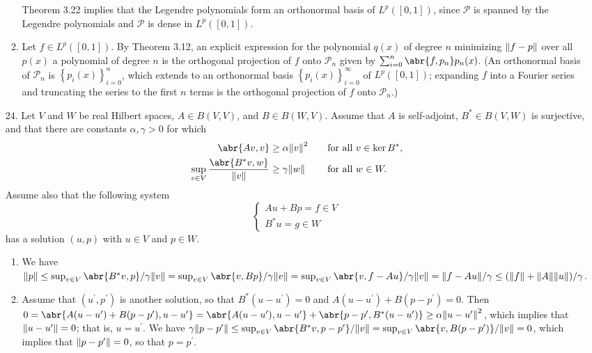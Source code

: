 \documentclass[11pt,leqno]{article}
\theoremstyle{plain}
\theoremstyle{definition}
\numberwithin{equation}{section}
\numberwithin{lem}{section}
\newcommand{\cbr}[1]{\left\{#1\right\}}
\begin{document}
\begin{enumerate}
\begin{enumerate}
        Theorem 3.22 implies that the Legendre polynomials form an orthonormal basis of $L^p([0,1])$, since $\mathcal P$ is spanned by the Legendre polynomials and $\mathcal P$ is dense in $L^p([0,1])$.
        \item Let $f\in L^p([0,1])$. By Theorem 3.12, an explicit expression for the polynomial $q(x)$ of degree $n$ minimizing $\norm{f-p}$ over all $p(x)$ a polynomial of degree $n$ is the orthogonal projection of $f$ onto $\mathcal P_n$ given by $\sum_{i=0}^n \abr{f,p_n}p_n(x)$. (An orthonormal basis of $\mathcal P_n$ is $\cbr{p_i(x)}_{i=0}^n$, which extends to an orthonormal basis $\cbr{p_i(x)}_{i=0}^\infty$ of $L^p([0,1])$; expanding $f$ into a Fourier series and truncating the series to the first $n$ terms is the orthogonal projection of $f$ onto $\mathcal P_n$.)
    \end{enumerate}
    \item[24.] Let $V$ and $W$ be real Hilbert spaces, $A\in B(V,V)$, and $B\in B(W,V)$. Assume that $A$ is self-adjoint, $B^\ast\in B(V,W)$ is surjective, and that there are constants $\alpha,\gamma>0$ for which 
    \begin{alignat*}{2}
        \abr{Av,v}&\geq \alpha \norm{v}^2 &&\quad\text{for all }v\in \ker B^\ast,\\
        \sup_{v\in V}\frac{\abr{B^\ast v,w}}{\norm{v}}&\geq \gamma\norm{w} &&\quad\text{for all }w\in W.
    \end{alignat*}
    Assume also that the following system 
    \begin{equation*}
        \begin{cases*}
            Au+Bp = f\in V \\
            B^\ast u = g\in W
        \end{cases*}
    \end{equation*}
    has a solution $(u,p)$ with $u\in V$ and $p\in W$.
    \begin{enumerate}
        \item We have $\norm{p}\leq \sup_{v\in V}\abr{B^\ast v, p}/\gamma\norm{v} = \sup_{v\in V}\abr{v, Bp}/\gamma\norm{v} = \sup_{v\in V}\abr{v, f-Au}/\gamma\norm{v} = \norm{f-Au}/\gamma\leq (\norm{f}+ \norm{A}\norm{u})/\gamma$.
        \item Assume that $(u^\prime,p^\prime)$ is another solution, so that $B^\ast(u-u^\prime) = 0$ and $A(u-u^\prime)+B(p-p^\prime) = 0$. Then $0 = \abr{A(u-u^\prime) + B(p-p^\prime), u-u^\prime} = \abr{A(u-u^\prime) , u-u^\prime}  + \abr{p-p^\prime, B^\ast(u-u^\prime)}\geq \alpha\norm{u-u^\prime}^2$, which implies that $\norm{u-u^\prime} = 0$; that is, $u = u^\prime$. We have $\gamma\norm{p-p^\prime}\leq \sup_{v\in V}\abr{B^\ast v, p-p^\prime}/\norm{v} = \sup_{v\in V}\abr{v,B(p-p^\prime)}/\norm{v} = 0$, which implies that $\norm{p-p^\prime} = 0$, so that $p =p^\prime$.

\end{enumerate}
\end{enumerate}
\end{document}
